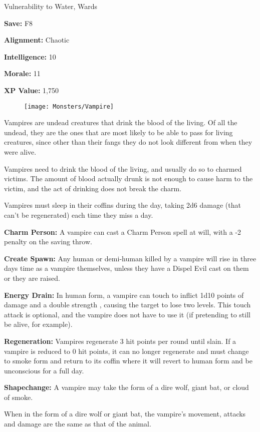 \begin{multicols*}{2}
{Vulnerability to Water, Wards

\textbf{Save:} F8

\textbf{Alignment:} Chaotic

\textbf{Intelligence:} 10

\textbf{Morale:} 11

\textbf{XP Value:} 1,750}

\parbox{\columnwidth}{
	\begin{wrapfigure}{r}{0.5\columnwidth}
	\texttt{[image: Monsters/Vampire]}
\end{wrapfigure}

Vampires are undead creatures that drink the blood of the living. Of all the undead, they are the ones that are most likely to be able to pass for living creatures, since other than their fangs they do not look different from when they were alive.

Vampires need to drink the blood of the living, and usually do so to charmed victims. The amount of blood actually drunk is not enough to cause harm to the victim, and the act of drinking does not break the charm.

Vampires must sleep in their coffins during the day, taking 2d6 damage (that can’t be regenerated) each time they miss a day. 
}

\textbf{Charm Person:} A vampire can cast a Charm Person spell at will, with a -2 penalty on the saving throw.

\textbf{Create Spawn:} Any human or demi-human killed by a vampire will rise in three days time as a vampire themselves, unless they have a Dispel Evil cast on them or they are raised.

\textbf{Energy Drain:} In human form, a vampire can touch to inflict 1d10 points of damage and a double strength , causing the target to lose two levels. This touch attack is optional, and the vampire does not have to use it (if pretending to still be alive, for example).

\textbf{Regeneration:} Vampires regenerate 3 hit points per round until slain. If a vampire is reduced to 0 hit points, it can no longer regenerate and must change to smoke form and return to its coffin where it will revert to human form and be unconscious for a full day.

\textbf{Shapechange:} A vampire may take the form of a dire wolf, giant bat, or cloud of smoke.

When in the form of a dire wolf or giant bat, the vampire’s movement, attacks and damage are the same as that of the animal.


\end{multicols*}
